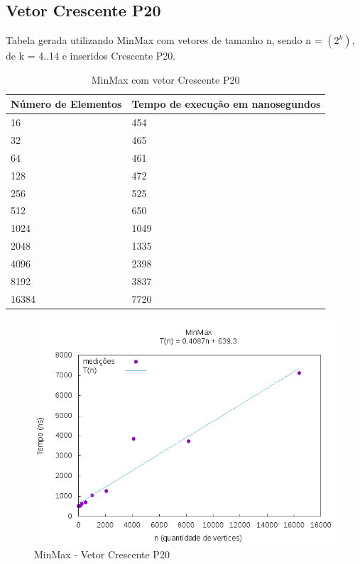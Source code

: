\documentclass[12pt,a4paper,twoside]{report}
\begin{document}
\subsection{Vetor Crescente P20}
Tabela gerada utilizando MinMax com vetores de tamanho n, sendo n = $(2^k)$, de k = 4..14 e inseridos Crescente P20.
\begin{table}[H]
\centering
\caption{MinMax com vetor Crescente P20}
\label{my-label}
\begin{tabular}{|l|l|}
\hline
\multicolumn{1}{|c|}{\textbf{Número de Elementos}} & \multicolumn{1}{c|}{\textbf{Tempo de execução em nanosegundos}} \\ \hline
16 & 454 \\ \hline
32 & 465 \\ \hline
64 & 461 \\ \hline
128 & 472 \\ \hline
256 & 525 \\ \hline
512 & 650 \\ \hline
1024 & 1049 \\ \hline
2048 & 1335 \\ \hline
4096 & 2398 \\ \hline
8192 & 3837 \\ \hline
16384 & 7720 \\ \hline
\end{tabular}
\end{table}

\begin{figure}[H]
    \centering
    \includegraphics[width=0.7\linewidth]{graficos/Min Max/Crescente P20/MinMax.png}
  \caption{MinMax - Vetor Crescente P20}
\end{figure}
\end{document}
